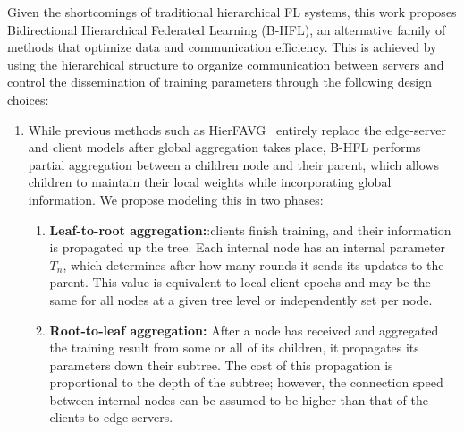 



Given the shortcomings of traditional hierarchical FL systems, this work proposes Bidirectional Hierarchical Federated Learning (B-HFL), an alternative family of methods that optimize data and communication efficiency. This is achieved by using the hierarchical structure to organize communication between servers and control the dissemination of training parameters through the following design choices:

\begin{enumerate}
    \item While previous methods such as HierFAVG~\citep{Client-Edge-CloudHierFL,Hier_Het_Cellular} entirely replace the edge-server and client models after global aggregation takes place, B-HFL performs partial aggregation between a children node and their parent, which allows children to maintain their local weights while incorporating global information. We propose modeling this in two phases:

          \begin{enumerate}
              \item \textbf{Leaf-to-root aggregation:}:clients finish training, and their information is propagated up the tree. Each internal node has an internal parameter $T_n$, which determines after how many rounds it sends its updates to the parent. This value is equivalent to local client epochs and may be the same for all nodes at a given tree level or independently set per node.
              \item \textbf{Root-to-leaf aggregation:} After a node has received and aggregated the training result from some or all of its children, it propagates its parameters down their subtree. The cost of this propagation is proportional to the depth of the subtree; however, the connection speed between internal nodes can be assumed to be higher than that of the clients to edge servers.
          \end{enumerate}


\end{enumerate}
